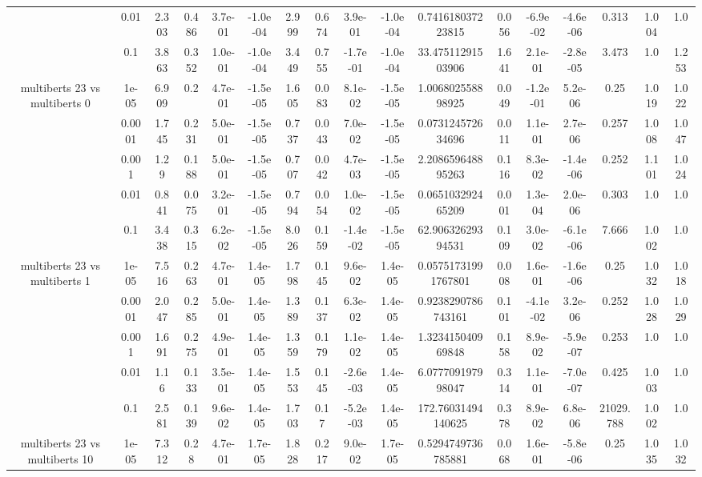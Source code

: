 \begin{tabular}{|c|c|c|c|c|c|c|c|c|c|c|c|c|c|c|c|c|}
 & 0.01 & 2.303 & 0.486 & 3.7e-01 & -1.0e-04 & 2.999 & 0.674 & 3.9e-01 & -1.0e-04 & 0.741618037223815 & 0.056 & -6.9e-02 & -4.6e-06 & 0.313 & 1.004 & 1.0 \\
 & 0.1 & 3.863 & 0.352 & 1.0e-01 & -1.0e-04 & 3.449 & 0.755 & -1.7e-01 & -1.0e-04 & 33.47511291503906 & 1.641 & 2.1e-01 & -2.8e-05 & 3.473 & 1.0 & 1.253 \\
\hline
\multirow{5}{*}{multiberts 23 vs multiberts 0} & 1e-05 & 6.909 & 0.2 & 4.7e-01 & -1.5e-05 & 1.605 & 0.083 & 8.1e-02 & -1.5e-05 & 1.006802558898925 & 0.049 & -1.2e-01 & 5.2e-06 & 0.25 & 1.019 & 1.022 \\
 & 0.0001 & 1.745 & 0.231 & 5.0e-01 & -1.5e-05 & 0.737 & 0.043 & 7.0e-02 & -1.5e-05 & 0.073124572634696 & 0.011 & 1.1e-01 & 2.7e-06 & 0.257 & 1.008 & 1.047 \\
 & 0.001 & 1.29 & 0.188 & 5.0e-01 & -1.5e-05 & 0.707 & 0.042 & 4.7e-03 & -1.5e-05 & 2.208659648895263 & 0.116 & 8.3e-02 & -1.4e-06 & 0.252 & 1.101 & 1.024 \\
 & 0.01 & 0.841 & 0.075 & 3.2e-01 & -1.5e-05 & 0.794 & 0.054 & 1.0e-02 & -1.5e-05 & 0.065103292465209 & 0.001 & 1.3e-04 & 2.0e-06 & 0.303 & 1.0 & 1.0 \\
 & 0.1 & 3.438 & 0.315 & 6.2e-02 & -1.5e-05 & 8.026 & 0.159 & -1.4e-02 & -1.5e-05 & 62.90632629394531 & 0.109 & 3.0e-02 & -6.1e-06 & 7.666 & 1.002 & 1.0 \\
\hline
\multirow{5}{*}{multiberts 23 vs multiberts 1} & 1e-05 & 7.516 & 0.263 & 4.7e-01 & 1.4e-05 & 1.798 & 0.145 & 9.6e-02 & 1.4e-05 & 0.05751731991767801 & 0.008 & 1.6e-01 & -1.6e-06 & 0.25 & 1.032 & 1.018 \\
 & 0.0001 & 2.047 & 0.285 & 5.0e-01 & 1.4e-05 & 1.389 & 0.137 & 6.3e-02 & 1.4e-05 & 0.9238290786743161 & 0.101 & -4.1e-02 & 3.2e-06 & 0.252 & 1.028 & 1.029 \\
 & 0.001 & 1.691 & 0.275 & 4.9e-01 & 1.4e-05 & 1.359 & 0.179 & 1.1e-02 & 1.4e-05 & 1.323415040969848 & 0.158 & 8.9e-02 & -5.9e-07 & 0.253 & 1.0 & 1.0 \\
 & 0.01 & 1.16 & 0.133 & 3.5e-01 & 1.4e-05 & 1.553 & 0.145 & -2.6e-03 & 1.4e-05 & 6.077709197998047 & 0.314 & 1.1e-01 & -7.0e-07 & 0.425 & 1.003 & 1.0 \\
 & 0.1 & 2.581 & 0.139 & 9.6e-02 & 1.4e-05 & 1.703 & 0.17 & -5.2e-03 & 1.4e-05 & 172.76031494140625 & 0.378 & 8.9e-02 & 6.8e-06 & 21029.788 & 1.002 & 1.0 \\
\hline
\multirow{5}{*}{multiberts 23 vs multiberts 10} & 1e-05 & 7.312 & 0.28 & 4.7e-01 & 1.7e-05 & 1.828 & 0.217 & 9.0e-02 & 1.7e-05 & 0.5294749736785881 & 0.068 & 1.6e-01 & -5.8e-06 & 0.25 & 1.035 & 1.032 \\

\end{tabular}
